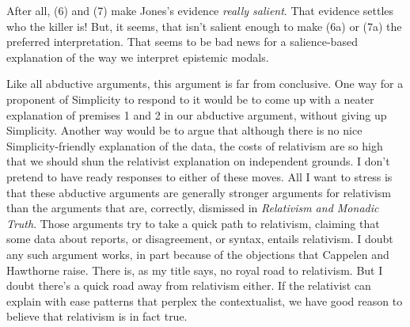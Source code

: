 \noindent After all, (6) and (7) make Jones's evidence \textit{really salient}. That evidence settles who the killer is! But, it seems, that isn't salient enough to make (6a) or (7a) the preferred interpretation. That seems to be bad news for a salience-based explanation of the way we interpret epistemic modals.

Like all abductive arguments, this argument is far from conclusive. One way for a proponent of Simplicity to respond to it would be to come up with a neater explanation of premises 1 and 2 in our abductive argument, without giving up Simplicity. Another way would be to argue that although there is no nice Simplicity-friendly explanation of the data, the costs of relativism are so high that we should shun the relativist explanation on independent grounds. I don't pretend to have ready responses to either of these moves. All I want to stress is that these abductive arguments are generally stronger arguments for relativism than the arguments that are, correctly, dismissed in \textit{Relativism and Monadic Truth}. Those arguments try to take a quick path to relativism, claiming that some data about reports, or disagreement, or syntax, entails relativism. I doubt any such argument works, in part because of the objections that Cappelen and Hawthorne raise. There is, as my title says, no royal road to relativism. But I doubt there's a quick road away from relativism either. If the relativist can explain with ease patterns that perplex the contextualist, we have good reason to believe that relativism is in fact true.
